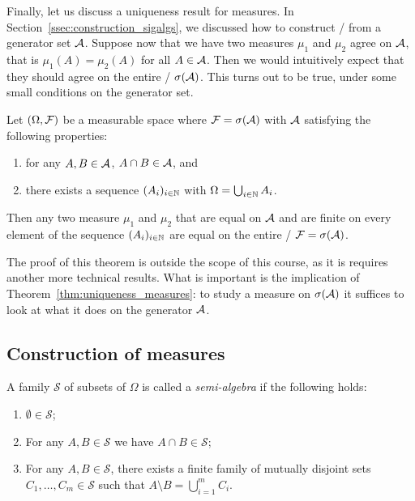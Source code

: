 Finally, let us discuss a uniqueness result for measures. In Section~\ref{ssec:construction_sigalgs}, we discussed how to construct \sigalgs/ from a generator set $\mathcal A$. Suppose now that we have two measures $\mu_1$ and $\mu_2$ agree on $\mathcal A$, that is $\mu_1(A) = \mu_2(A)$ for all $A \in \mathcal A$. Then we would intuitively expect that they should agree on the entire \sigalg/ $\sigma(\mathcal A)$. This turns out to be true, under some small conditions on the generator set.

\begin{theorem}\label{thm:uniqueness_measures}
Let $(\Omega ,\mathcal F)$ be a measurable space where $\mathcal F = \sigma(\mathcal A)$ with $\mathcal A$ satisfying the following properties:
\begin{enumerate}
\item for any $A, B \in \mathcal A$, $A \cap B \in \mathcal A$, and
\item there exists a sequence $(A_i)_{i \in \mathbb N}$ with $\Omega = \bigcup_{i \in \mathbb N} A_i$.
\end{enumerate}
Then any two measure $\mu_1$ and $\mu_2$ that are equal on $\mathcal A$ and are finite on every element of the sequence $(A_i)_{i \in \mathbb N}$ are equal on the entire \sigalg/ $\mathcal F = \sigma(\mathcal A)$.
\end{theorem}

The proof of this theorem is outside the scope of this course, as it is requires another more technical results. What is important is the implication of Theorem~\ref{thm:uniqueness_measures}: to study a measure on $\sigma(\mathcal A)$ it suffices to look at what it does on the generator $\mathcal A$.


\subsection{Construction of measures}



\begin{definition}\label{def:semi_algebra}
A family $\mathcal{S}$ of subsets of $\Omega$ is called a \emph{semi-algebra} if the following holds:
\begin{enumerate}
\item $\emptyset \in \mathcal{S}$;
\item For any $A, B \in \mathcal{S}$ we have $A \cap B \in \mathcal{S}$;
\item For any $A, B \in \mathcal{S}$, there exists a finite family of mutually disjoint sets $C_1, \dots, C_m \in \mathcal{S}$ such that $A \setminus B = \bigcup_{i = 1}^m C_i$.
\end{enumerate}
\end{definition}

